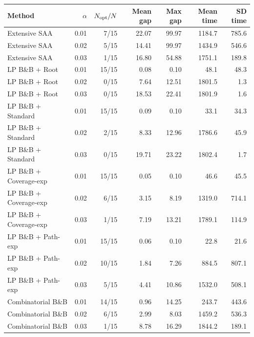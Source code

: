 \begin{tabular}{lrrrrrr}
\toprule
Method & $\alpha$ & $N_{\rm opt}/N$ & Mean gap & Max gap & Mean time & SD time \\
\midrule
Extensive SAA & 0.01 & 7/15 & 22.07 & 99.97 & 1184.7 & 785.6 \\
Extensive SAA & 0.02 & 5/15 & 14.41 & 99.97 & 1434.9 & 546.6 \\
Extensive SAA & 0.03 & 1/15 & 16.80 & 54.88 & 1751.1 & 189.8 \\
\addlinespace
LP B\&B + Root & 0.01 & 15/15 & 0.08 & 0.10 & 48.1 & 48.3 \\
LP B\&B + Root & 0.02 & 0/15 & 7.64 & 12.51 & 1801.5 & 1.3 \\
LP B\&B + Root & 0.03 & 0/15 & 18.53 & 22.41 & 1801.9 & 1.6 \\
\addlinespace
LP B\&B + Standard & 0.01 & 15/15 & 0.09 & 0.10 & 33.1 & 34.3 \\
LP B\&B + Standard & 0.02 & 2/15 & 8.33 & 12.96 & 1786.6 & 45.9 \\
LP B\&B + Standard & 0.03 & 0/15 & 19.71 & 23.22 & 1802.4 & 1.7 \\
\addlinespace
LP B\&B + Coverage-exp & 0.01 & 15/15 & 0.05 & 0.10 & 46.6 & 45.5 \\
LP B\&B + Coverage-exp & 0.02 & 6/15 & 3.15 & 8.19 & 1319.0 & 714.1 \\
LP B\&B + Coverage-exp & 0.03 & 1/15 & 7.19 & 13.21 & 1789.1 & 114.9 \\
\addlinespace
LP B\&B + Path-exp & 0.01 & 15/15 & 0.06 & 0.10 & 22.8 & 21.6 \\
LP B\&B + Path-exp & 0.02 & 10/15 & 1.84 & 7.26 & 884.5 & 807.1 \\
LP B\&B + Path-exp & 0.03 & 5/15 & 4.41 & 10.86 & 1532.0 & 508.1 \\
\addlinespace
Combinatorial B\&B & 0.01 & 14/15 & 0.96 & 14.25 & 243.7 & 443.6 \\
Combinatorial B\&B & 0.02 & 6/15 & 2.99 & 8.03 & 1459.2 & 536.3 \\
Combinatorial B\&B & 0.03 & 1/15 & 8.78 & 16.29 & 1844.2 & 189.1 \\
\bottomrule
\end{tabular}
